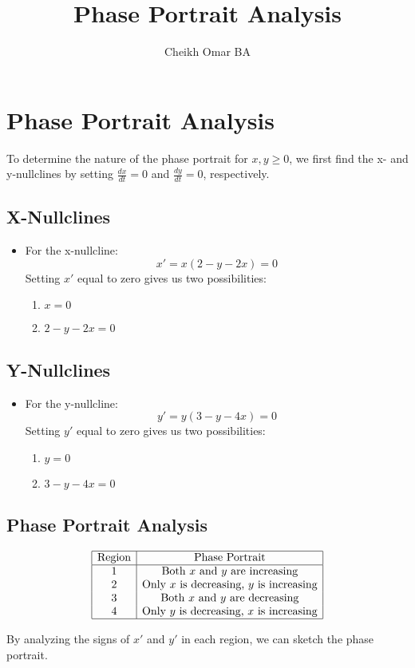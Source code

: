 \documentclass{article}
\title{Phase Portrait Analysis}
\author{Cheikh Omar BA}
\begin{document}
	
	\maketitle
	
	\section*{Phase Portrait Analysis}
	
	To determine the nature of the phase portrait for \( x, y \geq 0 \), we first find the x- and y-nullclines by setting \( \frac{dx}{dt} = 0 \) and \( \frac{dy}{dt} = 0 \), respectively.
	
	\subsection*{X-Nullclines}
	\begin{itemize}
		\item For the x-nullcline:
		\[ x' = x(2 - y - 2x) = 0 \]
		Setting \( x' \) equal to zero gives us two possibilities:
		\begin{enumerate}
			\item \( x = 0 \)
			\item \( 2 - y - 2x = 0 \)
		\end{enumerate}
	\end{itemize}
	
	\subsection*{Y-Nullclines}
	\begin{itemize}
		\item For the y-nullcline:
		\[ y' = y(3 - y - 4x) = 0 \]
		Setting \( y' \) equal to zero gives us two possibilities:
		\begin{enumerate}
			\item \( y = 0 \)
			\item \( 3 - y - 4x = 0 \)
		\end{enumerate}
	\end{itemize}
	
	\subsection*{Phase Portrait Analysis}
	\[
	\begin{array}{|c|c|}
	\hline
	\text{Region} & \text{Phase Portrait} \\
	\hline
	1 & \text{Both } x \text{ and } y \text{ are increasing} \\
	2 & \text{Only } x \text{ is decreasing, } y \text{ is increasing} \\
	3 & \text{Both } x \text{ and } y \text{ are decreasing} \\
	4 & \text{Only } y \text{ is decreasing, } x \text{ is increasing} \\
	\hline
	\end{array}
	\]
	
	By analyzing the signs of \( x' \) and \( y' \) in each region, we can sketch the phase portrait.
	
\end{document}
